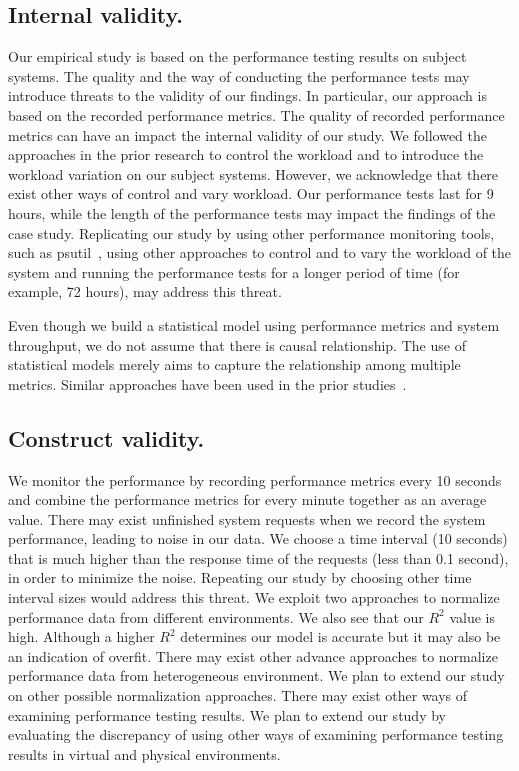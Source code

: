 	\subsection{Internal validity.}
	
	Our empirical study is based on the performance testing results on subject systems. The quality and the way of conducting the performance tests may introduce threats to the validity of our findings. In particular, our approach is based on the recorded performance metrics. The quality of recorded performance metrics can have an impact the internal validity of our study. We followed the approaches in the prior research to control the workload and to introduce the workload variation on our subject systems. However, we acknowledge that there exist other ways of control and vary workload. Our performance tests last for 9 hours, while the length of the performance tests may impact the findings of the case study. Replicating our study by using other performance monitoring tools, such as psutil~\cite{psutil}, using other approaches to control and to vary the workload of the system and running the performance tests for a longer period of time (for example, 72 hours), may address this threat.
	
	Even though we build a statistical model using performance metrics and system throughput, we do not assume that there is causal relationship. The use of statistical models merely aims to capture the relationship among multiple metrics. Similar approaches have been used in the prior studies~\cite{Cohen:2005:CIC:1095810.1095821, Shang:2015:ADP:2668930.2688052, xiong2013vperfguard}. 
	
	
	
	\subsection{Construct validity.}
	We monitor the performance by recording performance metrics every 10 seconds and combine the performance metrics for every minute together as an average value. There may exist unfinished system requests when we record the system performance, leading to noise in our data. We choose a time interval (10 seconds) that is much higher than the response time of the requests (less than 0.1 second), in order to minimize the noise. Repeating our study by choosing other time interval sizes would address this threat. We exploit two approaches to normalize performance data from different environments. We also see that our {$R^2$} value is high. Although a higher {$R^2$} determines our model is accurate but it may also be an indication of overfit. There may exist other advance approaches to normalize performance data from heterogeneous environment. We plan to extend our study on other possible normalization approaches. There may exist other ways of examining performance testing results. We plan to extend our study by evaluating the discrepancy of using other ways of examining performance testing results in virtual and physical environments.
	
